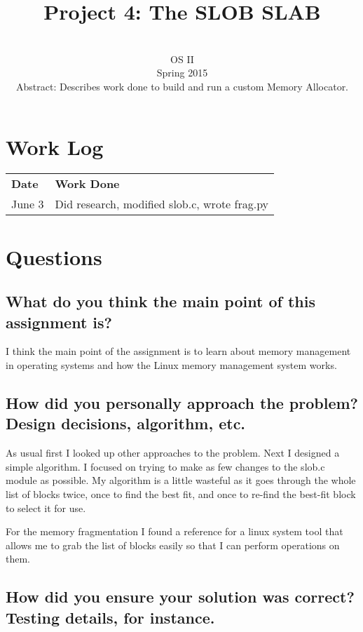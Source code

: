\documentclass[draftclsnofoot,onecolumn]{IEEEtran}
\date{}
\author{\name \\ 
OS II \\
Spring 2015 \\
Abstract: Describes work done to build and run a custom Memory Allocator.
}
\title{Project 4: The SLOB SLAB}
\begin{document}
\maketitle

\pagebreak

\tableofcontents

\pagebreak

\section{Work Log}

\begin{tabular}{ll}
  \textbf{Date} & \textbf{Work Done} \\
  June 3 & Did research, modified slob.c, wrote frag.py
\end{tabular}

\section{Questions}

\subsection{What do you think the main point of this assignment is?}

I think the main point of the assignment is to learn about memory management in operating systems and how the Linux memory management system works.

\subsection{How did you personally approach the problem? Design decisions, algorithm, etc.}

As usual first I looked up other approaches to the problem. Next I designed a simple algorithm. I focused on trying to make as few changes to the slob.c module as possible. My algorithm is a little wasteful as it goes through the whole list of blocks twice, once to find the best fit, and once to re-find the best-fit block to select it for use.

For the memory fragmentation I found a reference for a linux system tool that allows me to grab the list of blocks easily so that I can perform operations on them.

\subsection{How did you ensure your solution was correct? Testing details, for instance.}
\end{document}
